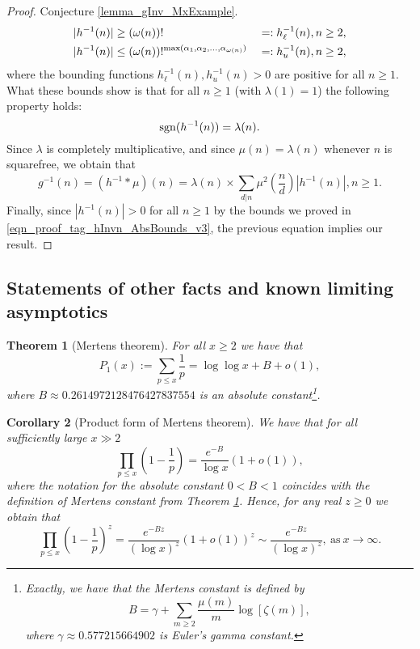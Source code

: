 \documentclass[11pt,reqno,a4letter]{article}
\numberwithin{figure}{section}
\numberwithin{table}{section}
\theoremstyle{plain}
\newtheorem{theorem}{Theorem}
\newtheorem{cor}[theorem]{Corollary}
\numberwithin{theorem}{section}
\theoremstyle{definition}
\begin{document}
\begin{proof}
{     Conjecture \ref{lemma_gInv_MxExample}. 
} 
\begin{align} 
\label{eqn_proof_tag_hInvn_AbsBounds_v3} 
|h^{-1}(n)| & \geq (\omega(n))! && =: h_{\ell}^{-1}(n), n \geq 2, \\ 
\notag 
|h^{-1}(n)| & \leq (\omega(n))!^{\max(\alpha_1, \alpha_2, \ldots, \alpha_{\omega(n)})} && =: h_u^{-1}(n), n \geq 2, 
\end{align} 
where the bounding functions $h_{\ell}^{-1}(n), h_{u}^{-1}(n) > 0$ are positive for all $n \geq 1$. 
What these bounds show is that for all $n \geq 1$ (with $\lambda(1) = 1$) the following property holds: 
\begin{equation} 
\notag 
\operatorname{sgn}(h^{-1}(n)) = \lambda(n). 
\end{equation} 
Since $\lambda$ is completely multiplicative, and since $\mu(n) = \lambda(n)$ whenever $n$ is squarefree, 
we obtain that 
\[
g^{-1}(n) = (h^{-1} \ast \mu)(n) = \lambda(n) \times \sum_{d|n} \mu^2\left(\frac{n}{d}\right) |h^{-1}(n)|, n \geq 1. 
\]
Finally, since $|h^{-1}(n)| > 0$ for all $n \geq 1$ by the bounds we proved in 
\eqref{eqn_proof_tag_hInvn_AbsBounds_v3}, the previous equation implies our result. 
\end{proof} 

\subsection{Statements of other facts and known limiting asymptotics} 
\label{subSection_OtherFactsAndResults} 

\begin{theorem}[Mertens theorem]
\label{theorem_Mertens_theorem} 
For all $x \geq 2$ we have that 
\[
P_1(x) := \sum_{p \leq x} \frac{1}{p} = \log\log x + B + o(1), 
\]
where 
$B \approx 0.2614972128476427837554$ 
is an absolute constant\footnote{ 
     Exactly, we have that the \emph{Mertens constant} is defined by 
     \[
     B = \gamma + \sum_{m \geq 2} \frac{\mu(m)}{m} \log\left[\zeta(m)\right], 
     \]
     where $\gamma \approx 0.577215664902$ is Euler's gamma constant. 
}.
\end{theorem} 

\begin{cor}[Product form of Mertens theorem] 
\label{lemma_Gz_productTermV2} 
We have that for all sufficiently large $x \gg 2$ 
\[
\prod_{p \leq x} \left(1 - \frac{1}{p}\right) = \frac{e^{-B}}{\log x}\left( 
     1 + o(1)\right), 
\]
where the notation for the absolute constant $0 < B < 1$ coincides with the definition of 
Mertens constant from Theorem \ref{theorem_Mertens_theorem}. 
Hence, for any real $z \geq 0$ we obtain that 
\[
\prod_{p \leq x} \left(1 - \frac{1}{p}\right)^{z} = 
     \frac{e^{-Bz}}{(\log x)^{z}} \left(1+o(1)\right)^{z} \sim 
     \frac{e^{-Bz}}{(\log x)^{z}}, \mathrm{\ as\ } x \rightarrow \infty. 
\]
\end{cor} 
\end{document}
